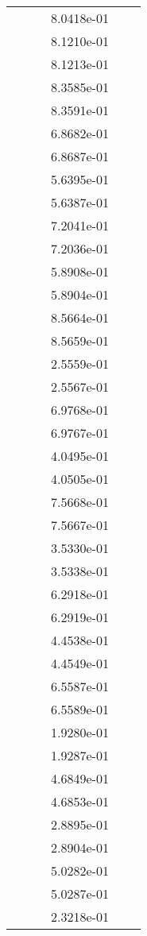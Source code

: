 \begin{xltabular}{\textwidth}{r|rS[table-format=1.3e+2]S[table-format=1.4e+2]S[table-format=1.4e+2]S[table-format=-1.5]}
&  &  & 8.0418e-01 & & \\
&  &  & 8.1210e-01 & & \\
&  &  & 8.1213e-01 & & \\
&  &  & 8.3585e-01 & & \\
&  &  & 8.3591e-01 & & \\
&  &  & 6.8682e-01 & & \\
&  &  & 6.8687e-01 & & \\
&  &  & 5.6395e-01 & & \\
&  &  & 5.6387e-01 & & \\
&  &  & 7.2041e-01 & & \\
&  &  & 7.2036e-01 & & \\
&  &  & 5.8908e-01 & & \\
&  &  & 5.8904e-01 & & \\
&  &  & 8.5664e-01 & & \\
&  &  & 8.5659e-01 & & \\
&  &  & 2.5559e-01 & & \\
&  &  & 2.5567e-01 & & \\
&  &  & 6.9768e-01 & & \\
&  &  & 6.9767e-01 & & \\
&  &  & 4.0495e-01 & & \\
&  &  & 4.0505e-01 & & \\
&  &  & 7.5668e-01 & & \\
&  &  & 7.5667e-01 & & \\
&  &  & 3.5330e-01 & & \\
&  &  & 3.5338e-01 & & \\
&  &  & 6.2918e-01 & & \\
&  &  & 6.2919e-01 & & \\
&  &  & 4.4538e-01 & & \\
&  &  & 4.4549e-01 & & \\
&  &  & 6.5587e-01 & & \\
&  &  & 6.5589e-01 & & \\
&  &  & 1.9280e-01 & & \\
&  &  & 1.9287e-01 & & \\
&  &  & 4.6849e-01 & & \\
&  &  & 4.6853e-01 & & \\
&  &  & 2.8895e-01 & & \\
&  &  & 2.8904e-01 & & \\
&  &  & 5.0282e-01 & & \\
&  &  & 5.0287e-01 & & \\
&  &  & 2.3218e-01 & & \\

\end{xltabular}
